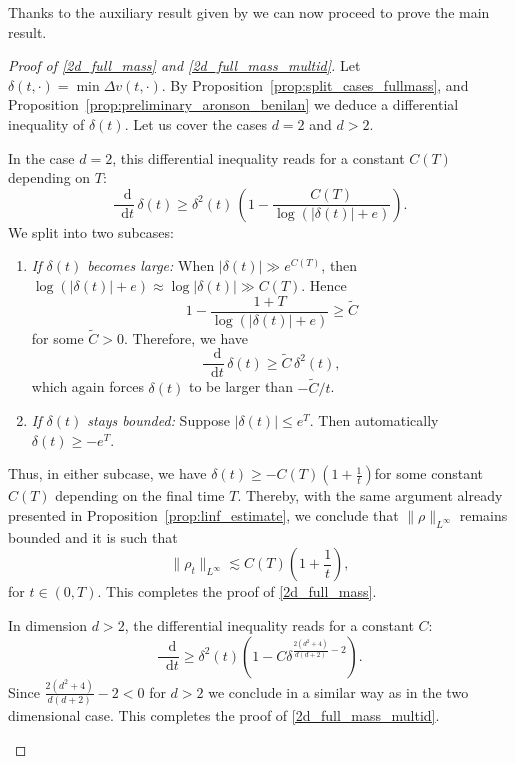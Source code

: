 \documentclass[11pt,a4paper]{article}
\numberwithin{equation}{section}
\theoremstyle{plain}
\theoremstyle{remark}
\newcommand {\f}{\frac}
\newcommand{\diff}{\mathop{}\!\mathrm{d}}
\newcommand{\step}[1][]{%
  \if\relax\detokenize{#1}\relax
    \def\thisstep{.}%
  \else
    \def\thisstep{: \protect #1.}%
  \fi
  \item}
\begin{document}
Thanks to the auxiliary result given by  we can now proceed to prove the main result.

\begin{proof}[Proof of \ref{2d_full_mass} and  \ref{2d_full_mass_multid}]
Let $\delta(t,\cdot)= \min \Delta v(t,\cdot)$.
By Proposition~\ref{prop:split_cases_fullmass}, and Proposition~\ref{prop:preliminary_aronson_benilan} we deduce a differential inequality of $\delta(t)$. Let us cover the cases $d=2$ and $d > 2$.

\begin{enumeratesteps}
\step[Dimension $d=2$]  
In the case $d=2$, this differential inequality reads for a constant $C(T)$ depending on $T$:
\[
  \f{\diff}{\diff t}\,\delta(t)
   \ge \delta^2(t)\,\left(1 - \f{C(T)}{\log\left(|\delta(t)| + e\right)}\right).
\]
We split into two subcases:

\begin{enumerate}
\item \emph{If $\delta(t)$ becomes large:} When $\left|\delta(t)\right|\gg e^{C(T)}$, then 
  $\log\left(|\delta(t)|+e\right)\approx \log|\delta(t)| \gg C(T)$.  Hence
  \[
    1 - \f{1+T}{\log\left(|\delta(t)| + e\right)}
     \ge  \widetilde{C}
  \]
  for some $\widetilde{C} > 0$.  Therefore, we have
  \[
    \f{\diff}{\diff t}\,\delta(t)
     \ge  \widetilde{C}\,\delta^2(t),
  \]
  which again forces $\delta(t)$ to be larger than $- \widetilde{C}/t$.

\item \emph{If $\delta(t)$ stays bounded:} Suppose $|\delta(t)| \le e^{T}$. 
  Then automatically $\delta(t) \ge -e^{T}$.  
\end{enumerate}

Thus, in either subcase, we have
$\delta(t) \ge -C(T)\left(1+\f{1}{t}\right)$for some  constant $C(T)$ depending on the final time $T$. Thereby, with the same argument already presented in  Proposition~\ref{prop:linf_estimate}, we conclude that $\|\rho\|_{L^\infty}$ remains bounded and it is such that
\[
  \|\rho_t\|_{L^\infty}
   \lesssim  C(T)\left(1+\f{1}{t}\right),
\]
for $t\in(0,T)$. This completes the proof of \ref{2d_full_mass}.

\step[Dimension $d>2$]
In dimension $d>2$, the differential inequality reads for a constant $C$:
$$
\f{\diff}{\diff t}\ge \delta^2(t)\left(1-C\delta^{\f{2(d^2+4)}{d(d+2)}-2}\right).
$$
Since $\f{2(d^2+4)}{d(d+2)}-2<0$ for $d>2$ we conclude in a similar way as in the two dimensional case. This completes the proof of \ref{2d_full_mass_multid}. \qedhere
\end{enumeratesteps}
\end{proof}
\end{document}

